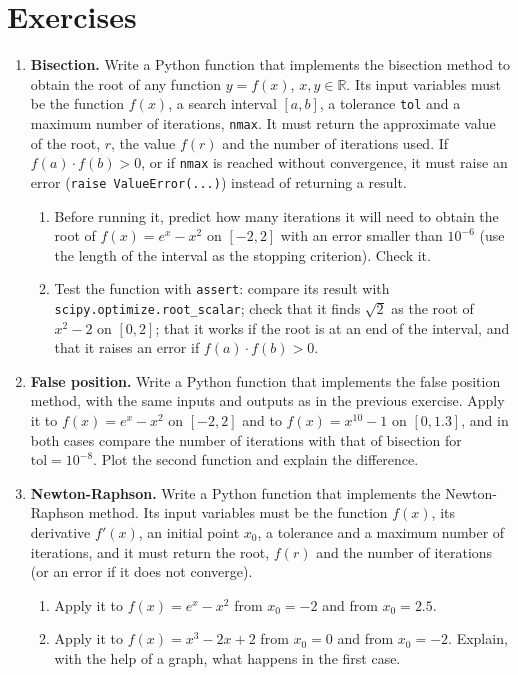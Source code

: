 \section{Exercises}
\begin{enumerate}
\item \label{ej:bisec-en} \textbf{Bisection.} Write a Python function that implements the bisection method to obtain the root of any function $y = f(x)$, $x, y \in \mathbb{R}$. Its input variables must be the function $f(x)$, a search interval $[a,b]$, a tolerance \texttt{tol} and a maximum number of iterations, \texttt{nmax}. It must return the approximate value of the root, $r$, the value $f(r)$ and the number of iterations used. If $f(a)\cdot f(b)>0$, or if \texttt{nmax} is reached without convergence, it must raise an error (\texttt{raise ValueError(...)}) instead of returning a result.
\begin{enumerate}
\item Before running it, predict how many iterations it will need to obtain the root of $f(x) = e^x-x^2$ on $[-2,2]$ with an error smaller than $10^{-6}$ (use the length of the interval as the stopping criterion). Check it.
\item Test the function with \texttt{assert}: compare its result with \texttt{scipy.optimize.root\_scalar}; check that it finds $\sqrt2$ as the root of $x^2-2$ on $[0, 2]$; that it works if the root is at an end of the interval, and that it raises an error if $f(a)\cdot f(b)>0$.
\end{enumerate}

\item \textbf{False position.} Write a Python function that implements the false position method, with the same inputs and outputs as in the previous exercise. Apply it to $f(x) = e^x-x^2$ on $[-2,2]$ and to $f(x)=x^{10}-1$ on $[0,1.3]$, and in both cases compare the number of iterations with that of bisection for $\text{tol}=10^{-8}$. Plot the second function and explain the difference.

\item \textbf{Newton-Raphson.} Write a Python function that implements the Newton-Raphson method. Its input variables must be the function $f(x)$, its derivative $f'(x)$, an initial point $x_0$, a tolerance and a maximum number of iterations, and it must return the root, $f(r)$ and the number of iterations (or an error if it does not converge).
\begin{enumerate}
\item Apply it to $f(x) = e^x-x^2$ from $x_0=-2$ and from $x_0=2.5$.
\item Apply it to $f(x)=x^3-2x+2$ from $x_0=0$ and from $x_0=-2$. Explain, with the help of a graph, what happens in the first case.
\end{enumerate}


\end{enumerate}
